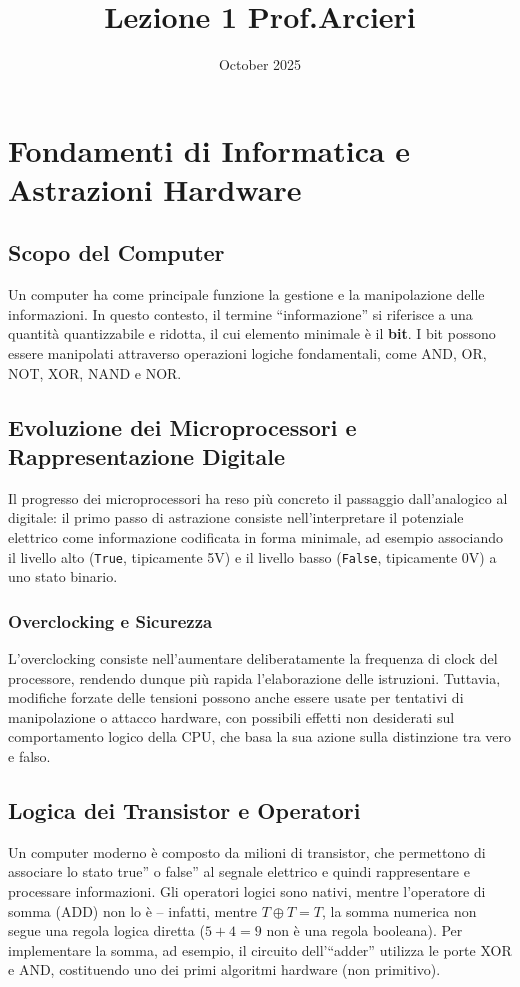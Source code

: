 \documentclass{article}
\title{Lezione 1 Prof.Arcieri}
\date{October 2025}
\begin{document}
\maketitle

\section{Fondamenti di Informatica e Astrazioni Hardware}

\subsection{Scopo del Computer}
Un computer ha come principale funzione la gestione e la manipolazione delle informazioni. In questo contesto, il termine ``informazione'' si riferisce a una quantità quantizzabile e ridotta, il cui elemento minimale è il \textbf{bit}. I bit possono essere manipolati attraverso operazioni logiche fondamentali, come AND, OR, NOT, XOR, NAND e NOR.

\subsection{Evoluzione dei Microprocessori e Rappresentazione Digitale}
Il progresso dei microprocessori ha reso più concreto il passaggio dall'analogico al digitale: il primo passo di astrazione consiste nell'interpretare il potenziale elettrico come informazione codificata in forma minimale, ad esempio associando il livello alto (\texttt{True}, tipicamente 5V) e il livello basso (\texttt{False}, tipicamente 0V) a uno stato binario.

\subsubsection{Overclocking e Sicurezza}
L'overclocking consiste nell'aumentare deliberatamente la frequenza di clock del processore, rendendo dunque più rapida l'elaborazione delle istruzioni. Tuttavia, modifiche forzate delle tensioni possono anche essere usate per tentativi di manipolazione o attacco hardware, con possibili effetti non desiderati sul comportamento logico della CPU, che basa la sua azione sulla distinzione tra vero e falso.

\subsection{Logica dei Transistor e Operatori}
Un computer moderno è composto da milioni di transistor, che permettono di associare lo stato true'' o false'' al segnale elettrico e quindi rappresentare e processare informazioni. Gli operatori logici sono nativi, mentre l'operatore di somma (ADD) non lo è -- infatti, mentre $T \oplus T = T$, la somma numerica non segue una regola logica diretta ($5+4=9$ non è una regola booleana). Per implementare la somma, ad esempio, il circuito dell'``adder'' utilizza le porte XOR e AND, costituendo uno dei primi algoritmi hardware (non primitivo).
\end{document}
